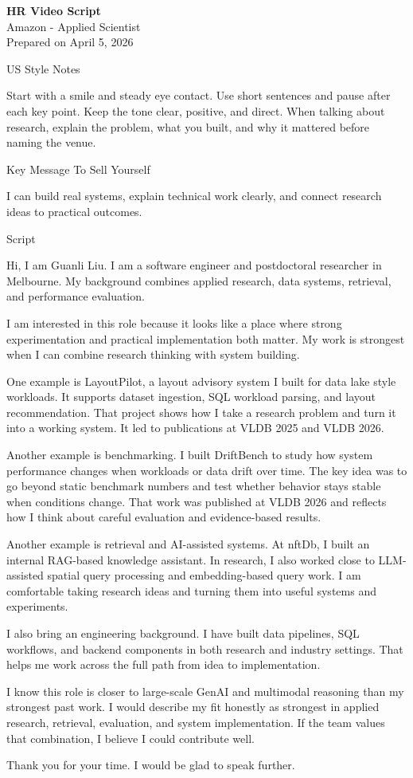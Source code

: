 \documentclass[11pt]{article}
\begin{document}
\thispagestyle{empty}
{\Large \textbf{HR Video Script}}\\
Amazon - Applied Scientist\\
Prepared on April 5, 2026

US Style Notes

Start with a smile and steady eye contact.
Use short sentences and pause after each key point.
Keep the tone clear, positive, and direct.
When talking about research, explain the problem, what you built, and why it mattered before naming the venue.

Key Message To Sell Yourself

I can build real systems, explain technical work clearly, and connect research ideas to practical outcomes.

Script

Hi, I am Guanli Liu. I am a software engineer and postdoctoral researcher in Melbourne. My background combines applied research, data systems, retrieval, and performance evaluation.

I am interested in this role because it looks like a place where strong experimentation and practical implementation both matter. My work is strongest when I can combine research thinking with system building.

One example is LayoutPilot, a layout advisory system I built for data lake style workloads. It supports dataset ingestion, SQL workload parsing, and layout recommendation. That project shows how I take a research problem and turn it into a working system. It led to publications at VLDB 2025 and VLDB 2026.

Another example is benchmarking. I built DriftBench to study how system performance changes when workloads or data drift over time. The key idea was to go beyond static benchmark numbers and test whether behavior stays stable when conditions change. That work was published at VLDB 2026 and reflects how I think about careful evaluation and evidence-based results.

Another example is retrieval and AI-assisted systems. At nftDb, I built an internal RAG-based knowledge assistant. In research, I also worked close to LLM-assisted spatial query processing and embedding-based query work. I am comfortable taking research ideas and turning them into useful systems and experiments.

I also bring an engineering background. I have built data pipelines, SQL workflows, and backend components in both research and industry settings. That helps me work across the full path from idea to implementation.

I know this role is closer to large-scale GenAI and multimodal reasoning than my strongest past work. I would describe my fit honestly as strongest in applied research, retrieval, evaluation, and system implementation. If the team values that combination, I believe I could contribute well.

Thank you for your time. I would be glad to speak further.
\end{document}

